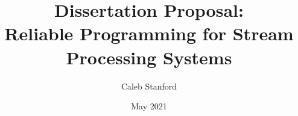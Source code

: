 \documentclass{article}
\title{\Large{} Dissertation Proposal: \\ Reliable Programming for Stream Processing Systems}
\author{Caleb Stanford}
\date{May 2021}
\begin{document}
\maketitle{}



\tableofcontents{}


% 








\renewcommand{\refname}{Other References}


\end{document}

